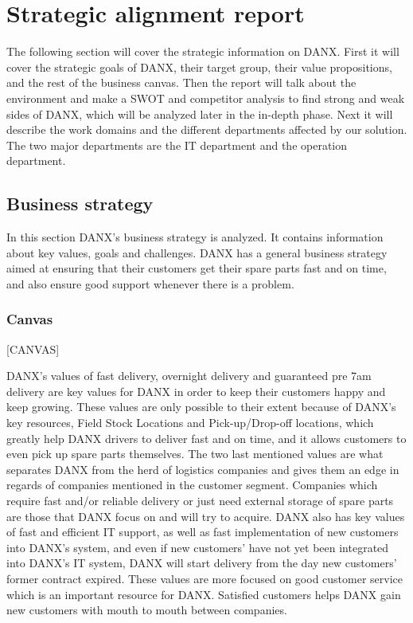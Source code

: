 \chapter{Strategic alignment report}
The following section will cover the strategic information on DANX. First it will cover the strategic goals of DANX, their target group, their value propositions, and the rest of the business canvas. 
Then the report will talk about the environment and make a SWOT and competitor analysis to find strong and weak sides of DANX, which will be analyzed later in the in-depth phase.
Next it will describe the work domains and the different departments affected by our solution. The two major departments are the IT department and the operation department.

\section*{Business strategy}
In this section DANX’s business strategy is analyzed. It contains information about key values, goals and challenges.
DANX has a general business strategy aimed at ensuring that their customers get their spare parts fast and on time, and also ensure good support whenever there is a problem.

\subsection{Canvas}

[CANVAS]


DANX's values of fast delivery, overnight delivery and guaranteed pre 7am delivery are key values for DANX in order to keep their customers happy and keep growing. These values are only possible to their extent because of DANX’s key resources, Field Stock Locations and  Pick-up/Drop-off locations, which greatly help DANX drivers to deliver fast and on time, and it allows customers to even pick up spare parts themselves. The two last mentioned values are what separates DANX from the herd of logistics companies and gives them an edge in regards of companies mentioned in the customer segment. Companies which require fast and/or reliable delivery or just need external storage of spare parts are those that DANX focus on and will try to acquire.
DANX also has key values of fast and efficient IT support, as well as fast implementation of new customers into DANX's system, and even if new customers' have not yet been integrated into DANX's IT system, DANX will start delivery from the day new customers' former contract expired. These values are more focused on good customer service which is an important resource for DANX. Satisfied customers helps DANX gain new customers with mouth to mouth between companies.

